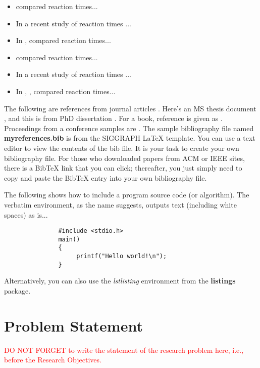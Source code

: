 \begin{itemize}
 \item {} compared reaction times...
 \item In a recent study of reaction times \cite{kartch:2000:ERA}...
 \item In , \citeauthor{kartch:2000:ERA} compared reaction times...
 \item {} compared reaction times... 
 \item In a recent study of reaction times \cite{fedkiw:2001:VSO}...
 \item In , , compared reaction times...
\end{itemize}

The following are references from journal articles \cite{Park:2006:DSI, Pellacini:2005:LAH, sako:2001:SSB}.
 Here's an MS thesis document \cite{yee:2000:SSA}, and this is from PhD dissertation \cite{kartch:2000:ERA}. 
 For a book, reference is given as  \cite{parke:1996:CFA}. 
 Proceedings from a conference samples are \cite{Jobs95, fedkiw:2001:VSO, levoy:2000:TDM}.  
 The sample bibliography file named \textbf{myreferences.bib} is from the SIGGRAPH \LaTeX{}  template.  
 You can use a text editor to view the contents of the bib file.  
 It is your task to create your own bibliography file.  
 For those who downloaded papers from ACM or IEEE sites, there is a BibTeX link that you can click; thereafter, you just simply need to copy and paste the BibTeX entry into your own bibliography file.

The following shows how to include a program source code (or algorithm).  
The verbatim environment, as the name suggests, outputs text (including white spaces) as is...

\begin{verbatim}
               #include <stdio.h>
               main()
               {
                    printf("Hello world!\n");
               }
\end{verbatim}

Alternatively, you can also use the \emph{lstlisting} environment from the \textbf{listings} package.

\section{Problem Statement}
\textcolor{red}{DO NOT FORGET to write the statement of the research problem here, i.e., before the Research Objectives.}

